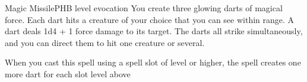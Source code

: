 \begin{spell}{Magic Missile}{PHB}{ level evocation}
{
}
You create three glowing darts of magical force. Each
dart hits a creature of your choice that you can see
within range. A dart deals 1d4 + 1 force damage to its
target. The darts all strike simultaneously, and you can
direct them to hit one creature or several.

 When you cast this spell using a
spell slot of  level or higher, the spell creates one
more dart for each slot level above 
\end{spell}
